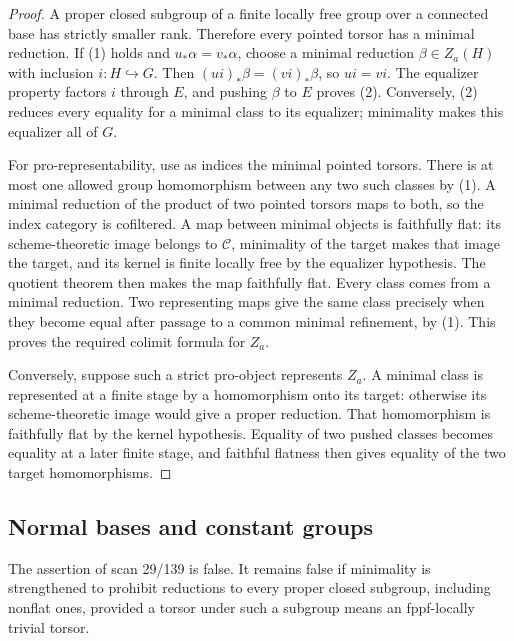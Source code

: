 \begin{proof}
A proper closed subgroup of a finite locally free group over a connected
base has strictly smaller rank.  Therefore every pointed torsor has a
minimal reduction.  If (1) holds and $u_*\alpha=v_*\alpha$, choose a
minimal reduction $\beta\in Z_a(H)$ with inclusion $i\colon H\hookrightarrow
G$.  Then $(ui)_*\beta=(vi)_*\beta$, so $ui=vi$.  The equalizer property
factors $i$ through $E$, and pushing $\beta$ to $E$ proves (2).
Conversely, (2) reduces every equality for a minimal class to its
equalizer; minimality makes this equalizer all of $G$.

For pro-representability, use as indices the minimal pointed torsors.
There is at most one allowed group homomorphism between any two such
classes by (1).  A minimal reduction of the product of two pointed
torsors maps to both, so the index category is cofiltered.  A map between
minimal objects is faithfully flat: its scheme-theoretic image belongs
to $\mathcal C$, minimality of the target makes that image the target,
and its kernel is finite locally free by the equalizer hypothesis.
The quotient theorem then makes the map faithfully flat.  Every class
comes from a minimal reduction.  Two representing maps give the same
class precisely when they become equal after passage to a common
minimal refinement, by (1).  This proves the required colimit formula
for $Z_a$.

Conversely, suppose such a strict pro-object represents $Z_a$.  A minimal
class is represented at a finite stage by a homomorphism onto its target:
otherwise its scheme-theoretic image would give a proper reduction.
That homomorphism is faithfully flat by the kernel hypothesis.  Equality
of two pushed classes becomes equality at a later finite stage, and
faithful flatness then gives equality of the two target homomorphisms.
\end{proof}

\subsection{Normal bases and constant groups}

\begin{proposition}
\label{C:cusp-all-subgroups}
The assertion of scan 29/139 is false.  It remains false if minimality
is strengthened to prohibit reductions to every proper closed subgroup,
including nonflat ones, provided a torsor under such a subgroup means
an fppf-locally trivial torsor.
\end{proposition}

